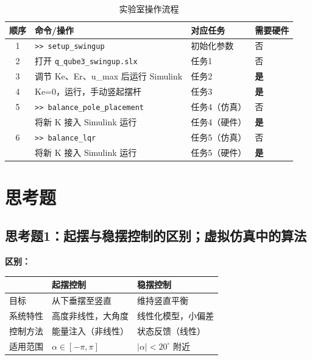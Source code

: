 \documentclass[12pt, a4paper]{article}
\begin{document}
\begin{table}[H]
\centering
\caption{实验室操作流程}
\begin{tabular}{clll}
\toprule
顺序 & 命令/操作 & 对应任务 & 需要硬件 \\
\midrule
1 & \texttt{>> setup\_swingup}            & 初始化参数   & 否 \\
2 & 打开 \texttt{q\_qube3\_swingup.slx}  & 任务1        & 否 \\
3 & 调节 Ke、Er、u\_max 后运行 Simulink  & 任务2        & \textbf{是} \\
4 & Ke=0，运行，手动竖起摆杆             & 任务3        & \textbf{是} \\
5 & \texttt{>> balance\_pole\_placement}  & 任务4（仿真）& 否 \\
  & 将新 K 接入 Simulink 运行             & 任务4（硬件）& \textbf{是} \\
6 & \texttt{>> balance\_lqr}              & 任务5（仿真）& 否 \\
  & 将新 K 接入 Simulink 运行             & 任务5（硬件）& \textbf{是} \\
\bottomrule
\end{tabular}
\end{table}

\section{思考题}

\subsection{思考题1：起摆与稳摆控制的区别；虚拟仿真中的算法}

\textbf{区别：}

\begin{table}[H]
\centering
\begin{tabular}{lll}
\toprule
& 起摆控制 & 稳摆控制 \\
\midrule
目标 & 从下垂摆至竖直 & 维持竖直平衡 \\
系统特性 & 高度非线性，大角度 & 线性化模型，小偏差 \\
控制方法 & 能量注入（非线性） & 状态反馈（线性） \\
适用范围 & $\alpha \in [-\pi, \pi]$ & $|\alpha| < 20^\circ$ 附近 \\
\bottomrule
\end{tabular}
\end{table}
\end{document}
